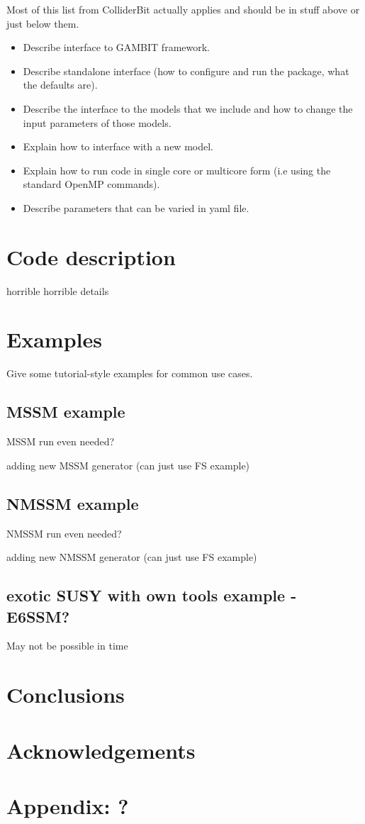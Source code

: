 \documentclass[11pt,a4paper]{article}
\begin{document}
Most of this list from ColliderBit actually applies and should be in stuff above or just below them.
\begin{itemize}
\item Describe interface to GAMBIT framework.
\item Describe standalone interface (how to configure and run the package, what the defaults are).
\item Describe the interface to the models that we include and how to change the input parameters of those models.
\item Explain how to interface with a new model.
\item Explain how to run code in single core or multicore form (i.e using the standard OpenMP commands).
\item Describe parameters that can be varied in yaml file.
\end{itemize}



\section{Code description}
horrible horrible details




\section{Examples}
Give some tutorial-style examples for common use cases.

\subsection{MSSM example}
MSSM run even needed?

adding new MSSM generator (can just use FS example)
\subsection{NMSSM example}
NMSSM run even needed?

adding new NMSSM generator (can just use FS example)
\subsection{exotic SUSY with own tools example - E6SSM?}
May not be possible in time

\section{Conclusions}

\section{Acknowledgements}

\section{Appendix: ?}
\end{document}
